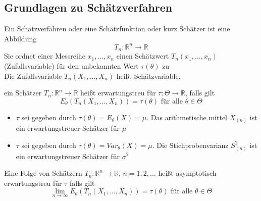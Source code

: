 \documentclass[
	ngerman,
	accentcolor=9c,%
	type=intern,
	marginpar=false
	]{tudapub}
\begin{document}
        \subsection{Grundlagen zu Schätzverfahren}
            \setcounter{satz}{1}
            \begin{definition}
                Ein Schätzverfahren oder eine Schätzfunktion oder kurz Schätzer ist eine Abbildung
                \begin{equation*}
                    T_n:\mathbb{R}^n \rightarrow \mathbb{R}
                \end{equation*}
                Sie ordnet einer Messreihe $x_1,\dots,x_n$ einen Schätzwert $T_n(x_1,\dots,x_n)$ (Zufallsvariable) für den unbekannten Wert $\tau(\theta)$ zu\\
                Die Zufallsvariable $T_n(X_1,\dots, X_n)$ heißt Schätzvariable.
            \end{definition}
            \begin{definition}
                ein Schätzer $T_n:\mathbb{R}^n \rightarrow \mathbb{R}$ heißt erwartungstreu für $\tau:\Theta \rightarrow \mathbb{R}$, falls gilt
                \begin{equation*}
                    E_\theta(T_n(X_1,\dots,X_n)) = \tau(\theta)\text{ für alle }\theta \in \Theta
                \end{equation*}
            \end{definition}
            \begin{definition}
                \begin{itemize}
                    \item $\tau$ sei gegeben durch $\tau(\theta) = E_\theta(X) = \mu$. Das arithmetische mittel $\bar{X}_{(n)}$ ist ein erwartungstreuer Schätzer für $\mu$
                    \item $\tau$ sei gegeben durch $\tau(\theta) = Var_\theta(X) = \mu$. Die Stichprobenvarianz $S^2_{(n)}$ ist ein erwartungstreuer Schätzer für $\sigma^2$
                \end{itemize}
            \end{definition}
            \begin{definition}
                Eine Folge von Schätzern $T_n:\mathbb{R}^n \rightarrow \mathbb{R}$, $n = 1,2,\dots$ heißt asymptotisch erwartungstreu für $\tau$ falls gilt
                \begin{equation*}
                    \lim_{n\rightarrow \infty}  E_\theta(T_n(X_1,\dots,X_n)) = \tau(\theta) \text{ für alle } \theta \in \Theta
                \end{equation*}
            \end{definition}
\end{document}
